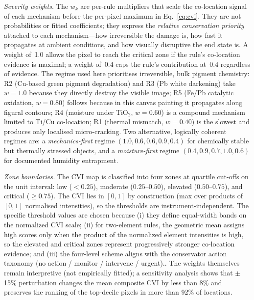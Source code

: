 \documentclass[conference]{IEEEtran}
\begin{document}
\textit{Severity weights.} The $w_k$ are per-rule multipliers that scale the co-location signal of each mechanism before the per-pixel maximum in Eq.~\eqref{eq:cvi}. They are not probabilities or fitted coefficients; they express the \emph{relative conservation priority} attached to each mechanism---how irreversible the damage is, how fast it propagates at ambient conditions, and how visually disruptive the end state is. A weight of~1.0 allows the pixel to reach the critical zone if the rule's co-location evidence is maximal; a weight of~0.4 caps the rule's contribution at~0.4 regardless of evidence. The regime used here prioritises irreversible, bulk pigment chemistry: R2 (Cu-based green pigment degradation) and R3 (Pb white darkening) take $w{=}1.0$ because they directly destroy the visible image; R5 (Fe/Pb catalytic oxidation, $w{=}0.80$) follows because in this canvas painting it propagates along figural contours; R4 (moisture under TiO$_2$, $w{=}0.60$) is a compound mechanism limited to Ti/Cu co-location; R1 (thermal mismatch, $w{=}0.40$) is the slowest and produces only localised micro-cracking. Two alternative, logically coherent regimes are: a \emph{mechanics-first} regime $(1.0, 0.6, 0.6, 0.9, 0.4)$ for chemically stable but thermally stressed objects, and a \emph{moisture-first} regime $(0.4, 0.9, 0.7, 1.0, 0.6)$ for documented humidity entrapment. 

\textit{Zone boundaries.} The CVI map is classified into four zones at quartile cut-offs on the unit interval: low ($<0.25$), moderate ($0.25$--$0.50$), elevated ($0.50$--$0.75$), and critical ($\geq 0.75$). The CVI lies in $[0,1]$ by construction (max over products of $[0,1]$ normalised intensities), so the thresholds are instrument-independent. The specific threshold values are chosen because (i) they define equal-width bands on the normalized CVI scale; (ii) for two-element rules, the geometric mean assigns high scores only when the product of the normalized element intensities is high, so the elevated and critical zones represent progressively stronger co-location evidence; and (iii) the four-level scheme aligns with the conservator action taxonomy (no action / monitor / intervene / urgent).. The weights themselves remain interpretive (not empirically fitted); a sensitivity analysis shows that $\pm$15\% perturbation changes the mean composite CVI by less than 8\% and preserves the ranking of the top-decile pixels in more than 92\% of locations.
\end{document}
